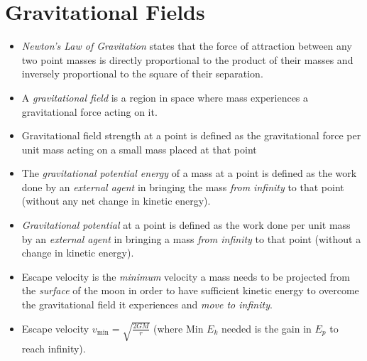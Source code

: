 \documentclass[oneside]{book}
\begin{document}
\chapter{Gravitational Fields}
\begin{itemize}
    \item \textit{Newton's Law of Gravitation} states that the force of attraction between any two point masses is directly proportional to the product of their masses and inversely proportional to the square of their separation.
    \item A \textit{gravitational field} is a region in space where mass experiences a gravitational force acting on it.
    \item Gravitational field strength at a point is defined as the gravitational force per unit mass acting on a small mass placed at that point
    \item The \textit{gravitational potential energy} of a mass at a point is defined as the work done by an \emph{external agent} in bringing the mass \emph{from infinity} to that point (without any net change in kinetic energy).
    \item \textit{Gravitational potential} at a point is defined as the work done per unit mass by an \emph{external agent} in bringing a mass \emph{from infinity} to that point (without a change in kinetic energy).
    \item Escape velocity is the \emph{minimum} velocity a mass needs to be projected from the \emph{surface} of the moon in order to have sufficient kinetic energy to overcome the gravitational field it experiences and \emph{move to infinity}.
    \item Escape velocity \(v_\text{min}=\sqrt{\frac{2GM}{r}}\) (where Min \(E_k\) needed is the gain in \(E_p\) to reach infinity).
\end{itemize}
\end{document}
